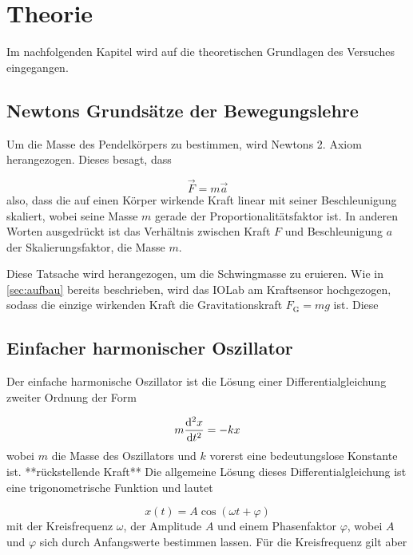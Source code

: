 \chapter{Theorie}
\label{sec:theorie}

Im nachfolgenden Kapitel wird auf die theoretischen Grundlagen des Versuches eingegangen.

\section{Newtons Grundsätze der Bewegungslehre}
Um die Masse des Pendelkörpers zu bestimmen, wird Newtons 2. Axiom herangezogen. \cite{newton} Dieses besagt, dass

\begin{equation}\label{eqn:newt}
	\vec{F} = m\vec{a}
\end{equation}
also, dass die auf einen Körper wirkende Kraft linear mit seiner Beschleunigung skaliert, wobei seine Masse \( m \) gerade der Proportionalitätsfaktor ist. In anderen Worten ausgedrückt ist das Verhältnis zwischen Kraft \( F \) und Beschleunigung \( a \) der Skalierungsfaktor, die Masse \( m \). 

Diese Tatsache wird herangezogen, um die Schwingmasse zu eruieren. Wie in \autoref{sec:aufbau} bereits beschrieben, wird das IOLab am Kraftsensor hochgezogen, sodass die einzige wirkenden Kraft die Gravitationskraft \( F_{\text{G}} = mg \) ist. Diese 


\section{Einfacher harmonischer Oszillator}
Der einfache harmonische Oszillator ist die Lösung einer Differentialgleichung zweiter Ordnung der Form

\begin{equation}\label{eqn:harmonic}
	m\dv[2]{x}{t} = -kx
\end{equation}
wobei \( m \) die Masse des Oszillators und \( k \) vorerst eine bedeutungslose Konstante ist. **rückstellende Kraft**
Die allgemeine Lösung dieses Differentialgleichung ist eine trigonometrische Funktion und lautet 

\begin{equation}\label{eqn:sol}
	x(t) = A\cos(\omega t + \varphi)
\end{equation}
mit der Kreisfrequenz \( \omega \), der Amplitude \( A \) und einem Phasenfaktor \( \varphi \), wobei \( A \) und \( \varphi \) sich durch Anfangswerte bestimmen lassen. Für die Kreisfrequenz gilt aber

